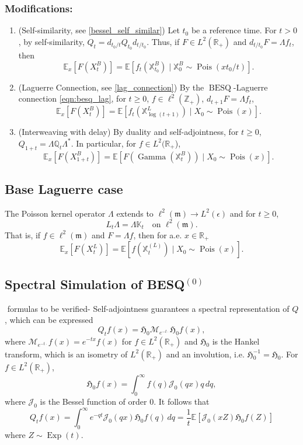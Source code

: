 \documentclass[11pt,a4,reqno]{amsart}
\numberwithin{equation}{section}
\theoremstyle{definition}
\theoremstyle{remark}
\newcommand{\bb}[1]{\mathbb{#1}}
\newcommand{\cl}[1]{\mathcal{#1}}
\newcommand{\frk}[1]{\mathfrak{#1}}
\newcommand{\E}{\bb{E}}
\newcommand{\R}{\bb{R}}
\newcommand{\Z}{\bb{Z}}
\DeclareMathOperator{\besq}{BESQ}
\DeclareMathOperator{\pois}{Pois}
\DeclareMathOperator{\Exp}{Exp}
\DeclareMathOperator{\Gam}{Gamma}
\newcommand{\beq}{\begin{equation}}
\newcommand{\eeq}{\end{equation}}
\begin{document}
\subsubsection{Modifications:}
	\begin{enumerate}
	
		\item (Self-similarity, see \ref{bessel_self_similar}) Let $t_0$ be a reference time. For $t > 0$, by self-similarity, $Q_t = d_{t_0/t} Q_{t_0} d_{t/t_0}$. Thus, if $F \in L^2(\R_+)$ and $d_{t/t_0} F = \Lambda f_t$, then
			\beq \E_x[F(X_t^B)] = \E[f_t(\bb{X}^B_{t_0}) \mid \bb{X}^B_0 \sim \pois(xt_0/t)] . \eeq
			
		\item (Laguerre Connection, see \ref{lag_connection}) By the $\besq$-Laguerre connection \eqref{eqn:besq_lag}, for $t \geq  0$, $f \in \ell^2(\Z_+)$, $d_{t + 1}F = \Lambda f_t$,
			\beq \E_x[F(X_t^{B})] = \E[f_t(\bb{X}^{L}_{\log (t + 1)}) \mid X_0 \sim \pois(x)] . \eeq
			
		\item (Interweaving with delay) By duality and self-adjointness, for $t \geq 0$,  $Q_{1 + t} = \Lambda \bb{Q}_t \Lambda^*$. In particular, for $f \in L^2(\R_+$), 
			\beq \E_x[F(X_{1 + t}^{B})] = \E[F(\Gam(\bb{X}_t^{B})) \mid X_0 \sim \pois(x)] . \eeq
	
	\end{enumerate}
	
\subsection{Base Laguerre case} 
	The Poisson kernel operator $\Lambda$ extends to $\ell^2(\frk{m}) \to L^2(\epsilon)$ and for $t \geq 0$, 
	\beq L_t\Lambda = \Lambda \bb{K}_t \quad \text{on } \ell^2(\frk{m}). \eeq
	That is, if $f \in \ell^2(\frk{m})$ and $F = \Lambda f$, then for a.e. $x \in \R_+$
	\beq \E_x[F(X_t^{L})] = \E[f(\bb{X}_t^{(L)}) \mid X_0 \sim \pois(x)] . \eeq
	
\subsection{Spectral Simulation of BESQ${}^{(0)}$}
	${}$ {\color{red} formulas to be verified-} Self-adjointness guarantees a spectral representation of $Q$, which can be expressed 
		\beq Q_t f(x) = \frk{H}_0 \cl{M}_{e^{-t\cdot}} \frk{H}_0 f(x), \eeq
		where $\cl{M}_{e^{-t\cdot}}f(x) = e^{-tx} f(x)$ for $f \in L^2(\R_+)$ and $\frk{H}_0$ is the Hankel transform, which is an isometry of $L^2(\R_+)$ and an involution, i.e. $\frk{H}_0^{-1} = \frk{H}_0$. For $f \in L^2(\R_+)$, 
		\beq \frk{H}_0 f(x) = \int_0^\infty f(q) \cl{J}_0(qx) q \, dq , \eeq
		where $\cl{J}_0$ is the Bessel function of order $0$. It follows that 
		\beq Q_tf(x) = \int_0^\infty e^{-qt} \cl{J}_0(qx) \frk{H}_0f(q) \, dq = \frac{1}{t} \E[\cl{J}_0(xZ) \frk{H}_0f(Z)] \eeq
		where $Z \sim \Exp(t)$. 
	
\end{document}
